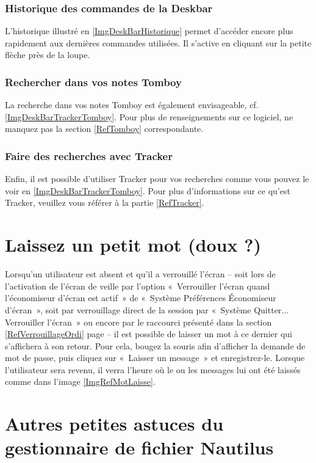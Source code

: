 \subsubsection{Historique des commandes de la Deskbar}
L'historique illustré en \ref{ImgDeskBarHistorique} permet d'accéder encore plus rapidement aux dernières commandes utilisées. Il s'active en cliquant sur la petite flèche près de la loupe.
\DeskBarPartieDeux
\afterpage{\clearpage}
\subsubsection{Rechercher dans vos notes Tomboy}
La recherche dans vos notes Tomboy est également envisageable, cf. \ref{ImgDeskBarTrackerTomboy}. Pour plus de renseignements sur ce logiciel, ne manquez pas la section \ref{RefTomboy} correspondante.
\subsubsection{Faire des recherches avec Tracker}
Enfin, il est possible d'utiliser Tracker pour vos recherches comme vous pouvez le voir en \ref{ImgDeskBarTrackerTomboy}. Pour plus d'informations sur ce qu'est Tracker, veuillez vous référer à la partie \ref{RefTracker}.
\section{Laissez un petit mot (doux ?)}
Lorsqu'un utilisateur est absent et qu'il a verrouillé l'écran -- soit lors de l'activation de l'écran de veille par l'option «~Verrouiller l'écran quand l'économiseur d'écran est actif~» de «~Système \FlecheDroite Préférences \FlecheDroite Économiseur d'écran~», soit par verrouillage direct de la session par «~Système \FlecheDroite Quitter... \FlecheDroite Verrouiller l'écran~» ou encore par le raccourci présenté dans la section \ref{RefVerrouillageOrdi} page \pageref{RefVerrouillageOrdi} -- il est possible de laisser un mot à ce dernier qui s'affichera à son retour. Pour cela, bougez la souris afin d'afficher la demande de mot de passe, puis cliquez sur «~Laisser un message~» et enregistrez-le. Lorsque l'utilisateur sera revenu, il verra l'heure où le ou les messages lui ont été laissés comme dans l'image \ref{ImgRefMotLaisse}.
\section{Autres petites astuces du gestionnaire de fichier Nautilus}
